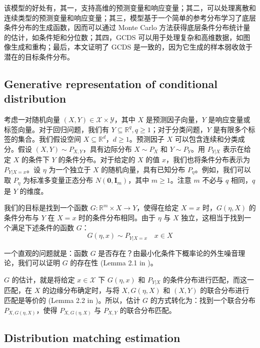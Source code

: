 \documentclass{myarticle}
\begin{document}
    该模型的好处有，其一，支持高维的预测变量和响应变量；其二，可以处理离散和连续类型的预测变量和响应变量；其三，模型基于一个简单的参考分布学习了底层条件分布的生成函数，因而可以通过 Monte Carlo 方法获得底层条件分布统计量的估计，如条件矩和分位数；其四，GCDS 可以用于处理复杂和高维数据，如图像生成和重构；最后，本文证明了 GCDS 是一致的，因为它生成的样本弱收敛于潜在的目标条件分布。

    \subsection{Generative representation of conditional distribution}

    考虑一对随机向量 $(X, Y) \in \mathcal{X} \times \mathcal{Y}$，其中 $X$ 是预测因子向量，$Y$ 是响应变量或标签向量。对于回归问题，我们有 $Y \subseteq \mathbb{R}^{q},  q \geq 1$；对于分类问题，$Y$ 是有限多个标签的集合。我们假设空间 $X \subseteq \mathbb{R}^{d}，d \geq 1$。预测因子 $X$ 可以包含连续和分类成分。假设 $(X, Y) \sim P_{X, Y}$，具有边际分布 $X \sim P_{X}$ 和 $Y \sim P_{Y}$。用 $P_{Y|X}$ 表示在给定 $X$ 的条件下 $Y$ 的条件分布。对于给定的 $X$ 的值 $x$，我们也将条件分布表示为 $P_{Y|X=x}$。设 $\eta$ 为一个独立于 $X$ 的随机向量，具有已知分布 $P_{\eta}$。例如，我们可以取 $P_{\eta}$ 为标准多变量正态分布 $N(\boldsymbol{0}, \boldsymbol{I}_{m})$，其中 $m \geq 1$。注意 $m$ 不必与 $q$ 相同，$q$ 是 $Y$ 的维度。

    我们的目标是找到一个函数 $G: \mathbb{R}^m \times X \rightarrow Y$，使得在给定 $X = x$ 时，$G(\eta, X)$ 的条件分布与 $Y$ 在 $X = x$ 时的条件分布相同。由于 $\eta$ 与 $X$ 独立，这相当于找到一个满足下述条件的函数 $G$：
    \begin{equation}
        G(\eta, x) \sim P_{Y|X=x} \quad x \in X
        \label{eq: con_dis_G_1}
    \end{equation}

    一个直观的问题就是：函数 $G$ 是否存在？由最小化条件下概率论的外生噪音理论，我们可以证明 $G$ 的存在性 (Lemma 2.1 in \cite{Zhou_Jiao_2022})。

    $G$ 的估计，就是将给定 $x\in\mathcal{X}$ 下 $G(\eta, x)$ 和 $P_{Y|X}$ 的条件分布进行匹配，而这一匹配，在 $X$ 的边缘分布确定时，与将 $X, G(\eta, X)$ 和 $(X, Y)$ 的联合分布进行匹配是等价的 (Lemma 2.2 in \cite{Zhou_Jiao_2022})。所以，估计 $G$ 的方式转化为：找到一个联合分布 $P_{X, G(\eta, X)}$，使得 $P_{X, G(\eta, X)}$ 与 $P_{X, Y}$ 的联合分布匹配。

    \subsection{Distribution matching estimation}
\end{document}
